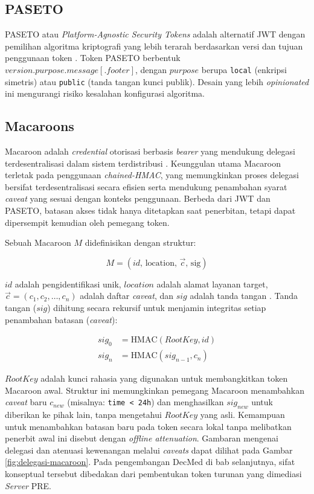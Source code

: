 \documentclass[bahasa, 12pt, a4paper, onecolumn, oneside, final]{report}
\begin{document}
\subsection{PASETO}
\label{subsec:paseto}

PASETO atau \textit{Platform-Agnostic Security Tokens} adalah alternatif JWT dengan pemilihan algoritma kriptografi yang lebih terarah berdasarkan versi dan tujuan penggunaan token \autocite{arciszewski2022paseto}. Token PASETO berbentuk $version.purpose.message[.footer]$, dengan $purpose$ berupa \texttt{local} (enkripsi simetris) atau \texttt{public} (tanda tangan kunci publik). Desain yang lebih \textit{opinionated} ini mengurangi risiko kesalahan konfigurasi algoritma.

\subsection{Macaroons}
\label{sec:macaroons}

Macaroon adalah \textit{credential} otorisasi berbasis \textit{bearer} yang mendukung delegasi terdesentralisasi dalam sistem terdistribusi \autocite{birgisson2014macaroons}. Keunggulan utama Macaroon terletak pada penggunaan \textit{chained-HMAC}, yang memungkinkan proses delegasi bersifat terdesentralisasi secara efisien serta mendukung penambahan syarat \textit{caveat} yang sesuai dengan konteks penggunaan. Berbeda dari JWT dan PASETO, batasan akses tidak hanya ditetapkan saat penerbitan, tetapi dapat dipersempit kemudian oleh pemegang token.

Sebuah Macaroon $M$ didefinisikan dengan struktur:

\begin{equation*}
	M = (id, \, \mathrm{location}, \, \vec{c}, \, \mathrm{sig})
\end{equation*}

$id$ adalah pengidentifikasi unik, $location$ adalah alamat layanan target, $\vec{c} = (c_1, c_2, \dots, c_n)$ adalah daftar \textit{caveat}, dan $sig$ adalah tanda tangan \autocite{birgisson2014macaroons}. Tanda tangan ($sig$) dihitung secara rekursif untuk menjamin integritas setiap penambahan batasan (\textit{caveat}):

\begin{align*}
	sig_0 & = \text{HMAC}(RootKey, id)    \\
	sig_n & = \text{HMAC}(sig_{n-1}, c_n)
\end{align*}

$RootKey$ adalah kunci rahasia yang digunakan untuk membangkitkan token Macaroon awal. Struktur ini memungkinkan pemegang Macaroon menambahkan \textit{caveat} baru $c_{new}$ (misalnya: \texttt{time < 24h}) dan menghasilkan $sig_{new}$ untuk diberikan ke pihak lain, tanpa mengetahui $RootKey$ yang asli. Kemampuan untuk menambahkan batasan baru pada token secara lokal tanpa melibatkan penerbit awal ini disebut dengan \textit{offline attenuation}. Gambaran mengenai delegasi dan atenuasi kewenangan melalui \textit{caveats} dapat dilihat pada Gambar \ref{fig:delegasi-macaroon}. Pada pengembangan DecMed di bab selanjutnya, sifat konseptual tersebut dibedakan dari pembentukan token turunan yang dimediasi \textit{Server} PRE.
\end{document}
